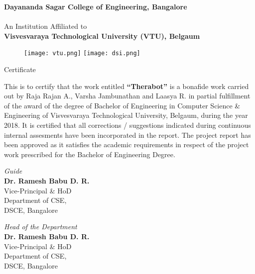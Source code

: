\thispagestyle{empty}

\setlength{\toptafiddle}{1in}
\setlength{\bottafiddle}{1in}

\vspace*{-0.75in}
\enlargethispage{\toptafiddle}

\begin{center}
\textbf{Dayananda Sagar College of Engineering, Bangalore}\\
\hspace{0.1cm}\\
An Institution Affiliated to\\
\textbf{Visvesvaraya Technological University (VTU), Belgaum}\\
\vspace{0.2cm}

\begin{figure}[h]
    \centering
    \texttt{[image: vtu.png]}
    \hspace{0.1\textwidth}
    \texttt{[image: dsi.png]}
\end{figure}

\Huge{Certificate}
\end{center}

This is to certify that the work entitled \textbf{``Therabot''} is a bonafide work carried out by Raja Rajan A., Varsha Jambunathan and Laasya R. in partial fulfillment of the award of the degree of Bachelor of Engineering in Computer Science \& Engineering of Visvesvaraya Technological University, Belgaum, during the year 2018. It is certified that all corrections / suggestions indicated during continuous internal assesments have been incorporated in the report. The project report has been approved as it satisfies the academic requirements in respect of the project work prescribed for the Bachelor of Engineering Degree.

\vfill

\begin{minipage}[t]{0.5\textwidth}
    \begin{flushleft}
        \emph{Guide}\\
        \textbf{Dr. Ramesh Babu D. R.}\\
        Vice-Principal \& HoD\\
        Department of CSE,\\
        DSCE, Bangalore\\
    \end{flushleft}
\end{minipage}
\begin{minipage}[t]{0.5\textwidth}
    \begin{flushright}
        \emph{Head of the Department}\\
        \textbf{Dr. Ramesh Babu D. R.}\\
        Vice-Principal \& HoD\\
        Department of CSE,\\
        DSCE, Bangalore\\
    \end{flushright}
\end{minipage}

